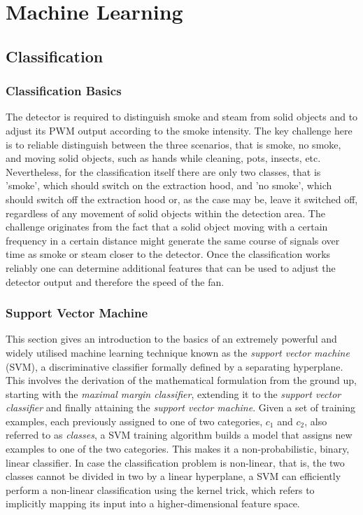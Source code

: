 \chapter{Machine Learning}
\label{ch:digital_filters}

\section{Classification}
\label{sec:classification}

\subsection{Classification Basics}

The detector is required to distinguish smoke and steam from solid objects and to adjust its PWM output according to the smoke intensity. The key challenge here is to reliable distinguish between the three scenarios, that is smoke, no smoke, and moving solid objects, such as hands while cleaning, pots, insects, etc. Nevertheless, for the classification itself there are only two classes, that is 'smoke', which should switch on the extraction hood, and 'no smoke', which should switch off the extraction hood or, as the case may be, leave it switched off, regardless of any movement of solid objects within the detection area. The challenge originates from the fact that a solid object moving with a certain frequency in a certain distance might generate the same course of signals over time as smoke or steam closer to the detector. Once the classification works reliably one can determine additional features that can be used to adjust the detector output and therefore the speed of the fan.

\subsection{Support Vector Machine}

This section gives an introduction to the basics of an extremely powerful and widely utilised machine learning technique known as the \emph{support vector machine} (SVM), a discriminative classifier formally defined by a separating hyperplane. This involves the derivation of the mathematical formulation from the ground up, starting with the \emph{maximal margin classifier}, extending it to the \emph{support vector classifier} and finally attaining the \emph{support vector machine}. Given a set of training examples, each previously assigned to one of two categories, $c_1$ and $c_2$, also referred to as \emph{classes}, a SVM training algorithm builds a model that assigns new examples to one of the two categories. This makes it a non-probabilistic, binary, linear classifier. In case the classification problem is non-linear, that is, the two classes cannot be divided in two by a linear hyperplane, a SVM can efficiently perform a non-linear classification using the kernel trick, which refers to implicitly mapping its input into a higher-dimensional feature space.

